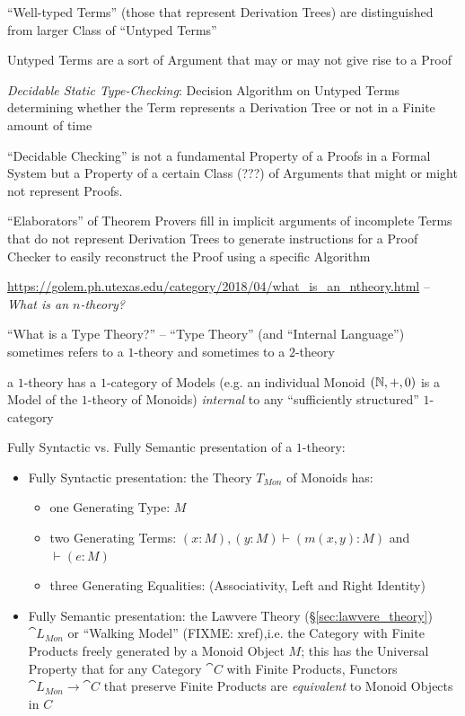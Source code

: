 ``Well-typed Terms'' (those that represent Derivation Trees) are
distinguished from larger Class of ``Untyped Terms''

Untyped Terms are a sort of Argument that may or may not give rise to
a Proof

\emph{Decidable Static Type-Checking}: Decision Algorithm on Untyped
Terms determining whether the Term represents a Derivation Tree or not
in a Finite amount of time

``Decidable Checking'' is not a fundamental Property of a Proofs in a
Formal System but a Property of a certain Class (???) of Arguments
that might or might not represent Proofs.

``Elaborators'' of Theorem Provers fill in implicit arguments of
incomplete Terms that do not represent Derivation Trees to generate
instructions for a Proof Checker to easily reconstruct the Proof using
a specific Algorithm


\asterism

\url{https://golem.ph.utexas.edu/category/2018/04/what_is_an_ntheory.html}
-- \emph{What is an $n$-theory?}

``What is a Type Theory?'' -- ``Type Theory'' (and ``Internal Language'')
sometimes refers to a $1$-theory and sometimes to a $2$-theory

a $1$-theory has a $1$-category of Models (e.g. an individual Monoid $(\mathbb{N}, +
, 0)$ is a Model of the $1$-theory of Monoids) \emph{internal} to any
``sufficiently structured'' $1$-category

Fully Syntactic vs. Fully Semantic presentation of a $1$-theory:

\begin{itemize}
  \item Fully Syntactic presentation: the Theory $T_{Mon}$ of Monoids has:
    \begin{itemize}
      \item one Generating Type: $M$
      \item two Generating Terms: $(x:M),(y:M) \vdash (m(x,y):M)$ and $\vdash
        (e:M)$
      \item three Generating Equalities: (Associativity, Left and Right
        Identity)
    \end{itemize}
  \item Fully Semantic presentation: the Lawvere Theory
    (\S\ref{sec:lawvere_theory}) $\cat{L}_{Mon}$ or ``Walking Model'' (FIXME:
    xref),i.e. the Category with Finite Products freely generated by a Monoid
    Object $M$; this has the Universal Property that for any Category $\cat{C}$
    with Finite Products, Functors $\cat{L}_{Mon} \rightarrow \cat{C}$ that
    preserve Finite Products are \emph{equivalent} to Monoid Objects in $C$
\end{itemize}

